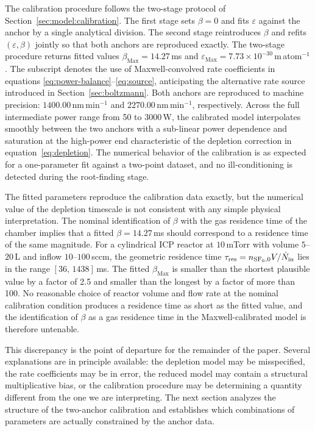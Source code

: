 The calibration procedure follows the two-stage protocol of
Section~\ref{sec:model:calibration}. The first stage sets
$\beta = 0$ and fits $\varepsilon$ against the \citet{mansano1999}
anchor by a single analytical division. The second stage
reintroduces $\beta$ and refits $(\varepsilon,\beta)$ jointly so
that both anchors are reproduced exactly. The two-stage procedure
returns fitted values
$\beta_{\mathrm{Max}} = 14.27\,$ms and
$\varepsilon_{\mathrm{Max}} = 7.73\times10^{-30}$\,m\,atom$^{-1}$.
The subscript denotes the use of Maxwell-convolved rate coefficients
in equations \eqref{eq:power-balance}--\eqref{eq:source},
anticipating the alternative rate source introduced in
Section~\ref{sec:boltzmann}. Both anchors are reproduced to machine
precision: $1400.00\,$nm\,min$^{-1}$ and
$2270.00\,$nm\,min$^{-1}$, respectively. Across the full
intermediate power range from 50 to $3000$\,W, the calibrated model
interpolates smoothly between the two anchors with a sub-linear
power dependence and saturation at the high-power end characteristic
of the depletion correction in equation~\eqref{eq:depletion}. The
numerical behavior of the calibration is as expected for a
one-parameter fit against a two-point dataset, and no
ill-conditioning is detected during the root-finding stage.

The fitted parameters reproduce the calibration data exactly, but
the numerical value of the depletion timescale is not consistent
with any simple physical interpretation. The nominal identification
of $\beta$ with the gas residence time of the chamber implies that
a fitted $\beta = 14.27\,$ms should correspond to a residence time
of the same magnitude. For a cylindrical ICP reactor at
$10\,$mTorr with volume $5$--$20\,$L and inflow
$10$--$100\,$sccm, the geometric residence time
$\tau_{\mathrm{res}} = n_{\mathrm{SF}_6,0} V / \dot N_{\mathrm{in}}$ lies in the
range $[36,\,1438]\,$ms. The fitted $\beta_{\mathrm{Max}}$ is
smaller than the shortest plausible value by a factor of 2.5 and
smaller than the longest by a factor of more than 100. No
reasonable choice of reactor volume and flow rate at the nominal
calibration condition produces a residence time as short as the
fitted value, and the identification of $\beta$ as a gas residence
time in the Maxwell-calibrated model is therefore untenable.

This discrepancy is the point of departure for the remainder of the
paper. Several explanations are in principle available: the
depletion model may be misspecified, the rate coefficients may be
in error, the reduced model may contain a structural multiplicative
bias, or the calibration procedure may be determining a quantity
different from the one we are interpreting. The next section
analyzes the structure of the two-anchor calibration and establishes
which combinations of parameters are actually constrained by the
anchor data.
